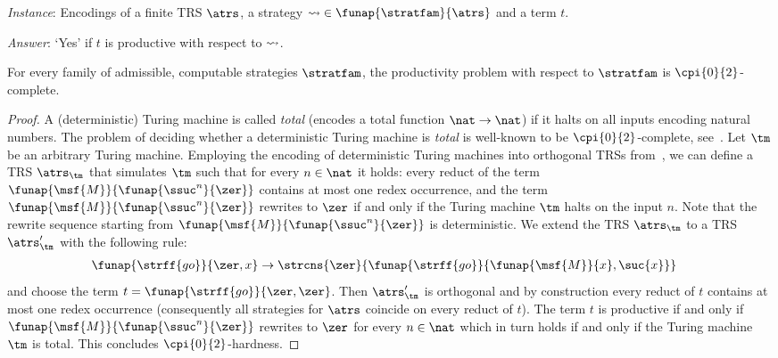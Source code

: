 \emph{Instance}:
  Encodings of a finite TRS $\atrs$, 
  a strategy ${\strategy} \in \funap{\stratfam}{\atrs}$ 
  and a term $t$.

\emph{Answer}:
  `Yes' if $t$ is productive with respect to $\leadsto$. 

\begin{theorem}\label{thm:strategy}
  For every family of admissible, computable strategies $\stratfam$,
  the productivity problem with respect to $\stratfam$ 
  is $\cpi{0}{2}$-complete.
\end{theorem}

\begin{proof}{
  \newcommand{\from}{\funap{\msf{from}}}
  \newcommand{\run}{\funap{\msf{M}}}
  A (deterministic) Turing machine is called \emph{total} (encodes a total function $\nat \to \nat$) 
  if it halts on all inputs encoding natural numbers.
  The problem of deciding whether a deterministic Turing machine is \emph{total} is well-known to be $\cpi{0}{2}$-complete, see~\cite{hinman:1978}.
  Let $\tm$ be an arbitrary Turing machine.
  Employing the encoding of deterministic Turing machines into orthogonal TRSs from~\cite{jw:handbook},
  we can define a TRS $\atrs_\tm$ that simulates $\tm$ such that
  for every $n \in \nat$ it holds:
  every reduct of the term $\run{\funap{\ssuc^n}{\zer}}$ contains at most one redex occurrence,
  and the term $\run{\funap{\ssuc^n}{\zer}}$ rewrites to $\zer$ 
  if and only if the Turing machine $\tm$ halts on the input $n$.
  Note that the rewrite sequence starting from $\run{\funap{\ssuc^n}{\zer}}$ is deterministic.
  We extend the TRS $\atrs_\tm$ to a TRS $\atrs'_\tm$ with the following rule:
\begin{align*}
\funap{\strff{go}}{\zer,x} &\to \strcns{\zer}{\funap{\strff{go}}{\run{x},\suc{x}}}
\end{align*}
and choose the term $t = \funap{\strff{go}}{\zer,\zer}$.
  Then $\atrs'_\tm$ is orthogonal and 
  by construction every reduct of $t$ contains at most one redex occurrence
  (consequently all strategies for $\atrs$ coincide on every reduct of $t$).
  The term $t$ is productive
  if and only if
  $\run{\funap{\ssuc^n}{\zer}}$ rewrites to $\zer$ for every $n \in \nat$
  which in turn holds if and only if
  the Turing machine $\tm$ is total.
  This concludes $\cpi{0}{2}$-hardness.

}
\end{proof}
